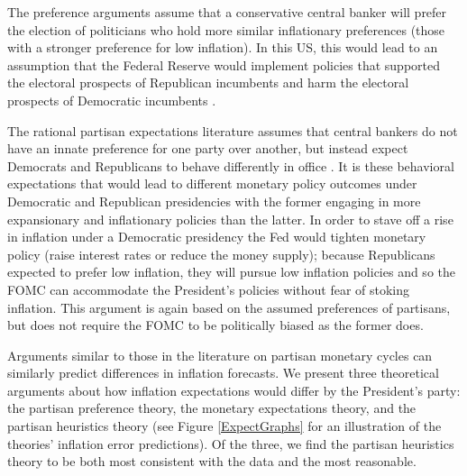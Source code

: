 \documentclass[a4paper]{article}\usepackage{graphicx, color}
\begin{document}
The preference arguments assume that a conservative central banker will prefer the election of politicians who hold more similar inflationary preferences (those with a stronger preference for low inflation). In this US, this would lead to an assumption that the Federal Reserve would implement policies that supported the electoral prospects of Republican incumbents and harm the electoral prospects of Democratic incumbents \citep{Clark2011,Hakes1988,Sieg1997,Tootell1996}.

The rational partisan expectations literature assumes that central bankers do not have an innate preference for one party over another, but instead expect Democrats and Republicans to behave differently in office \citep{Alesina1991,Hibbs1994}. It is these behavioral expectations that would lead to different monetary policy outcomes under Democratic and Republican presidencies with the former engaging in more expansionary and inflationary policies than the latter. In order to stave off a rise in inflation under a Democratic presidency the Fed would tighten monetary policy (raise interest rates or reduce the money supply); because Republicans expected to prefer low inflation, they will pursue low inflation policies and so the FOMC can accommodate the President's policies without fear of stoking inflation. This argument is again based on the assumed preferences of partisans, but does not require the FOMC to be politically biased as the former does. 

Arguments similar to those in the literature on partisan monetary cycles can similarly predict differences in inflation forecasts. We present three theoretical arguments about how inflation expectations would differ by the President's party: the partisan preference theory, the monetary expectations theory, and the partisan heuristics theory (see Figure \ref{ExpectGraphs} for an illustration of the theories' inflation error predictions). Of the three, we find the partisan heuristics theory to be both most consistent with the data and the most reasonable.
\end{document}
